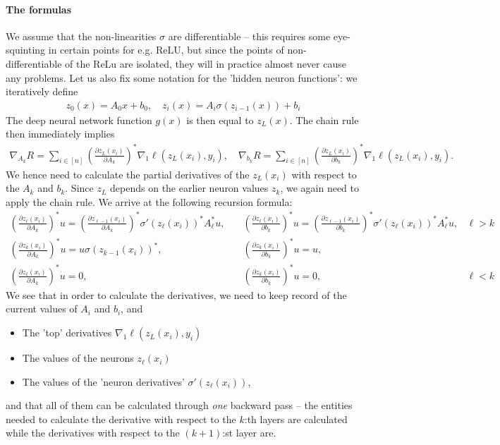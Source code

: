 \documentclass{article}
\newcommand{\ReLU}{\mathrm{ReLU}}
\begin{document}
\paragraph{The formulas}  We assume that the non-linearities $\sigma$ are differentiable -- this requires some eye-squinting in certain points for e.g. $\ReLU$, but since the points of non-differentiable of the ReLu are isolated, they will in practice almost never cause any problems. Let us also fix some notation for the 'hidden neuron functions': we iteratively define
\begin{align*}
    z_0(x) = A_0x+ b_0, \quad z_{i}(x) = A_i\sigma(z_{i-1}(x))+ b_i 
\end{align*}
The deep neural network function $g(x)$ is then equal to $z_L(x)$. The chain rule then immediately implies 
\begin{align}
    \nabla_{A_k} R = \sum_{i \in [n]} \left(\frac{\partial z_{L}(x_i)}{\partial A_k}\right)^*\nabla_1\ell(z_L(x_i),y_i),\quad  \nabla_{b_k} R = \sum_{i \in [n]} \left(\frac{\partial z_{L}(x_i)}{\partial b_k}\right)^*\nabla_1\ell(z_L(x_i),y_i). \label{eq:derivative_risk}
\end{align}
We hence need to calculate the partial derivatives of the $z_L(x_i)$ with respect to the $A_k$ and $b_k$. Since $z_L$ depends on the earlier neuron values $z_k$, we again need to apply the chain rule. We arrive at the following recursion formula:
\begin{align*}
 \left(\frac{\partial z_{\ell}(x_i)}{\partial A_k}\right)^* u =  \left(\frac{\partial z_{\ell-1}(x_i)}{\partial A_k}\right)^*\sigma'(z_\ell(x_i))^*A_\ell^*u, &\quad   \left(\frac{\partial z_{\ell}(x_i)}{\partial b_k}\right)^* u=  \left(\frac{\partial z_{\ell-1}(x_i)}{\partial b_k}\right)^*\sigma'(z_\ell(x_i))^*A_\ell^*u ,  &\ell>k \\
    \left(\frac{\partial z_{k}(x_i)}{\partial A_k}\right)^* u = u \sigma(z_{k-1}(x_i))^*, &\quad   \left(\frac{\partial z_{k}(x_i)}{\partial b_k}\right)^* u = u, & \\
    \left(\frac{\partial z_{\ell}(x_i)}{\partial A_k}\right)^* u = 0, &\quad   \left(\frac{\partial z_{k}(x_i)}{\partial b_k}\right)^* u = 0,  &\ell<k
\end{align*}
We see that in order to calculate the derivatives, we need to keep record of the current values of $A_i$ and $b_i$, and 
\begin{itemize}
    \item The 'top' derivatives $\nabla_1\ell(z_L(x_i),y_i)$
    \item The values of the neurons $z_\ell(x_i)$
    \item The values of the 'neuron derivatives' $\sigma'(z_\ell(x_i))$,
\end{itemize}
and that all of them can be calculated through \emph{one} backward pass -- the entities needed to calculate the derivative with respect to the $k$:th layers are calculated while the derivatives with respect to the $(k+1)$:st layer are.
\end{document}
